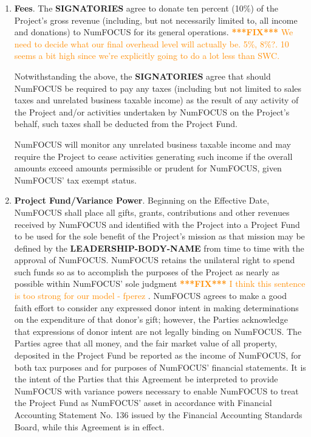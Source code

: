\documentclass[letterpaper,12pt]{article}
\newcommand{\fix}[1]{
  \textcolor{darkorange} { \textbf{***FIX***} #1 } }
\newcommand{\signatories}{\textbf{SIGNATORIES}}
\newcommand{\leadershipbody}{\textbf{LEADERSHIP-BODY-NAME}}
\begin{document}
\begin{enumerate}[label=\arabic*.,ref=\S~\arabic*]
\begin{enumerate}[label=\alph*.,ref=\theenumi(\alph*)]
\item \textbf{Project Not An Agent Of NumFOCUS}. The \signatories{} hereby
  acknowledge that the Project and the \leadershipbody{} do not and shall not
  act as an agent for NumFOCUS unless specifically authorized in writing by
  NumFOCUS to do so.

\end{enumerate}

\item \textbf{Fees}. The \signatories{} agree to donate ten percent (10\%) of
  the Project's gross revenue (including, but not necessarily limited to, all
  income and donations) to NumFOCUS for its general operations. \fix{We need to
    decide what our final overhead level will actually be. 5\%, 8\%?. 10 seems
    a bit high since we're explicitly going to do a lot less than SWC.}


Notwithstanding the above, the \signatories{} agree that should NumFOCUS
be required to pay any taxes (including but not limited to sales taxes
and unrelated business taxable income) as the result of any activity
of the Project and/or activities undertaken by NumFOCUS on the
Project's behalf, such taxes shall be deducted from the Project Fund.


NumFOCUS will monitor any unrelated business taxable income and
may require the Project to cease activities generating such income
if the overall amounts exceed amounts permissible or prudent for NumFOCUS,
given NumFOCUS' tax exempt status.

\item \textbf{Project Fund/Variance Power}. Beginning on the Effective Date,
  NumFOCUS shall place all gifts, grants, contributions and other revenues
  received by NumFOCUS and identified with the Project into a Project Fund to
  be used for the sole benefit of the Project's mission as that mission may be
  defined by the \leadershipbody{} from time to time with the approval of
  NumFOCUS. NumFOCUS retains the unilateral right to spend such funds so as to
  accomplish the purposes of the Project as nearly as possible within NumFOCUS'
  sole judgment \fix{I think this sentence is too strong for our model -
    fperez}.  NumFOCUS agrees to make a good faith effort to consider any
  expressed donor intent in making determinations on the expenditure of that
  donor's gift; however, the Parties acknowledge that expressions of donor
  intent are not legally binding on NumFOCUS. The Parties agree that all money,
  and the fair market value of all property, deposited in the Project Fund be
  reported as the income of NumFOCUS, for both tax purposes and for purposes of
  NumFOCUS' financial statements. It is the intent of the Parties that this
  Agreement be interpreted to provide NumFOCUS with variance powers necessary
  to enable NumFOCUS to treat the Project Fund as NumFOCUS' asset in accordance
  with Financial Accounting Statement No. 136 issued by the Financial
  Accounting Standards Board, while this Agreement is in effect.
  

\end{enumerate}
\end{document}
